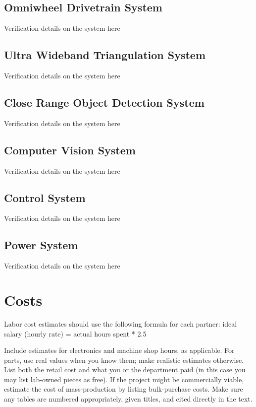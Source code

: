 \documentclass{report}
\begin{document}
    \section{Omniwheel Drivetrain System}
    Verification details on the system here

    \section{Ultra Wideband Triangulation System}
    Verification details on the system here
    
    \section{Close Range Object Detection System}
    Verification details on the system here
    
    \section{Computer Vision System}
    Verification details on the system here
    
    \section{Control System}
    Verification details on the system here
    
    \section{Power System}
    Verification details on the system here

    \chapter{Costs}

    Labor cost estimates should use the following formula for each partner: ideal salary (hourly rate) = actual hours spent * 2.5 
    
    Include estimates for electronics and machine shop hours, as applicable. For parts, use real values when you know them; make realistic estimates otherwise. List both the retail cost and what you or the department paid (in this case you may list lab-owned pieces as free). If the project might be commercially viable, estimate the cost of mass-production by listing bulk-purchase costs. Make sure any tables are numbered appropriately, given titles, and cited directly in the text. 
\end{document}
